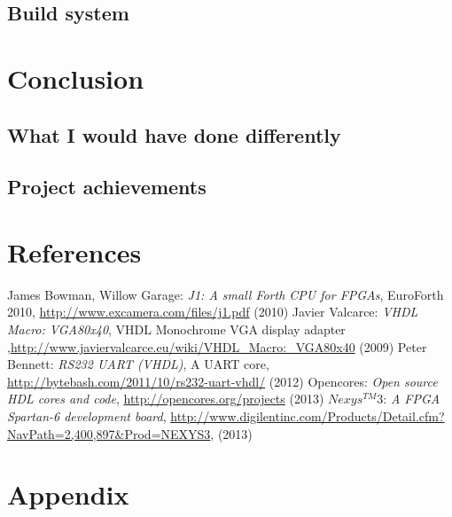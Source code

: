 \documentclass	[a4paper, 10pt]	{article}
\begin{document}
    \subsection{Build system}

  \section{Conclusion}
    \subsection{What I would have done differently}
    \subsection{Project achievements}
  \section{References}

    \begin{thebibliography}{1}              %
     James Bowman, Willow Garage: \emph{J1: A small Forth CPU for FPGAs},  EuroForth 2010, \url{http://www.excamera.com/files/j1.pdf} (2010)
     Javier Valcarce: \emph{VHDL Macro: VGA80x40}, VHDL Monochrome VGA display adapter ,\url{http://www.javiervalcarce.eu/wiki/VHDL_Macro:_VGA80x40} (2009)
     Peter Bennett: \emph{RS232 UART (VHDL)}, A UART core, \url{http://bytebash.com/2011/10/rs232-uart-vhdl/} (2012)
     Opencores: \emph{Open source HDL cores and code}, \url{http://opencores.org/projects} (2013)
     $Nexys^{TM}$3: \emph{A FPGA Spartan-6 development board}, \url{http://www.digilentinc.com/Products/Detail.cfm?NavPath=2,400,897\&Prod=NEXYS3}, (2013)
    \end{thebibliography}



  \section{Appendix}
\end{document}
